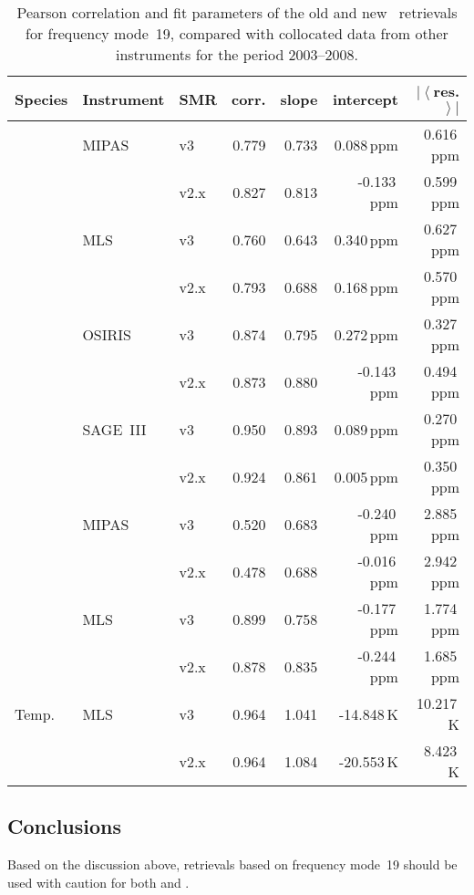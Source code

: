\begin{table}[hbt]
\centering
\caption{Pearson correlation and fit parameters of the old and new \smr\
retrievals for frequency mode~19, compared with collocated data from other
instruments for the period 2003--2008.
}
\label{tab:fm19:stats}
\begin{tabular}{lllrrrr}
    \toprule
    \textbf{Species} & \textbf{Instrument} & \textbf{SMR} & \textbf{corr.} & \textbf{slope} & \textbf{intercept} & \textbf{$\left|\left<\right.\right.$res.$\left.\left.\right>\right|$} \\
    \midrule
    \chem{O3}   & MIPAS     & v3    & 0.779 & 0.733 & 0.088\,ppm    & 0.616\,ppm \\
                &           & v2.x  & 0.827 & 0.813 & -0.133\,ppm   & 0.599\,ppm \\
    \cline{2-7}
                & MLS       & v3    & 0.760 & 0.643 & 0.340\,ppm    & 0.627\,ppm \\
                &           & v2.x  & 0.793 & 0.688 & 0.168\,ppm    & 0.570\,ppm \\
    \cline{2-7}
                & OSIRIS    & v3    & 0.874 & 0.795 & 0.272\,ppm    & 0.327\,ppm \\
                &           & v2.x  & 0.873 & 0.880 & -0.143\,ppm   & 0.494\,ppm \\
    \cline{2-7}
                & SAGE~III  & v3    & 0.950 & 0.893 & 0.089\,ppm    & 0.270\,ppm \\
                &           & v2.x  & 0.924 & 0.861 & 0.005\,ppm    & 0.350\,ppm \\
    \midrule
    \chem{H_2O} & MIPAS     & v3    & 0.520 & 0.683 & -0.240\,ppm   & 2.885\,ppm \\
                &           & v2.x  & 0.478 & 0.688 & -0.016\,ppm   & 2.942\,ppm \\
    \cline{2-7}
                & MLS       & v3    & 0.899 & 0.758 & -0.177\,ppm   & 1.774\,ppm \\
                &           & v2.x  & 0.878 & 0.835 & -0.244\,ppm   & 1.685\,ppm \\
    \midrule
    Temp.       & MLS       & v3    & 0.964 & 1.041 & -14.848\,K    & 10.217\,K \\
                &           & v2.x  & 0.964 & 1.084 & -20.553\,K    &  8.423\,K \\
    \bottomrule
\end{tabular}
\end{table}

\subsection{Conclusions}
\label{sec:fm19:conclusions}
Based on the discussion above, retrievals based on frequency mode~19 should be
used with caution for both \chem{O_3} and \chem{H_2O}.
